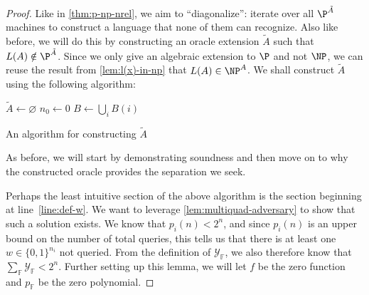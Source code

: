 \documentclass[english,12pt]{reedthesis}
\theoremstyle{plain}
\theoremstyle{definition}
\theoremstyle{remark}
\begin{document}
\begin{proof}
  Like in \cref{thm:p-np-nrel}, we aim to ``diagonalize'': iterate over all
  $\P^{\tilde{A}}$ machines to construct a language that none of them can
  recognize. Also like before, we will do this by constructing an oracle
  extension $\tilde{A}$ such that $L(A) \notin \P^{\tilde{A}}$. Since we only give an
  algebraic extension to $\P$ and not $\NP$, we can reuse the result from
  \cref{lem:l(x)-in-np} that $L(A) \in \NP^{A}$. We shall construct $\tilde{A}$
  using the following algorithm:
  \begin{algorithm}[htbp]
    $\tilde{A} \leftarrow \varnothing$\;
    $n_{0} \leftarrow 0$\;
    $B \leftarrow \bigcup_{i}B(i)$\;
    \caption{An algorithm for constructing $\tilde{A}$}\label{alg:construct-a-tilde}
  \end{algorithm}
  As before, we will start by demonstrating soundness and then move on to why
  the constructed oracle provides the separation we seek.

  Perhaps the least intuitive section of the above algorithm is the section
  beginning at line~\ref{line:def-w}. We want to leverage
  \cref{lem:multiquad-adversary} to show that such a solution exists. We know
  that $p_{i}(n) < 2^{n}$, and since $p_{i}(n)$ is an upper bound on the number
  of total queries, this tells us that there is at least one
  $w \in \{0, 1\}^{n_{i}}$ not queried. From the definition of $\mathcal{Y}_{\mathbb{F}}$,
  we also therefore know that $\sum_{\mathbb{F}}\mathcal{Y}_{\mathbb{F}} < 2^{n}$. Further
  setting up this lemma, we will let $f$ be the zero function and
  $p_{\mathbb{F}}$ be the zero polynomial.


\end{proof}
\end{document}
